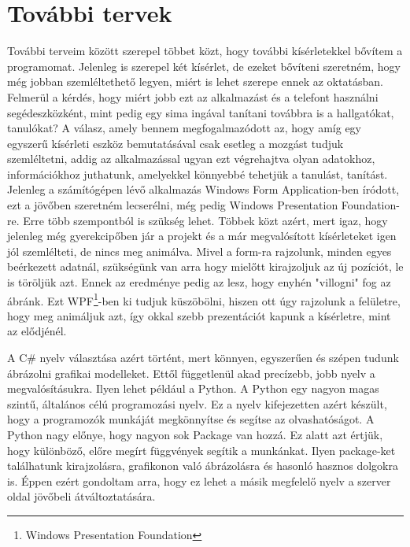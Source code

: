 \documentclass{thesis-ekf}
\theoremstyle{definition}
\theoremstyle{remark}
\begin{document}
\chapter{További tervek}
További terveim között szerepel többet közt, hogy további kísérletekkel bővítem a programomat. Jelenleg is szerepel két kísérlet, de ezeket bővíteni szeretném, hogy még jobban szemléltethető legyen, miért is lehet szerepe ennek az oktatásban. Felmerül a kérdés, hogy miért jobb ezt az alkalmazást és a telefont használni segédeszközként, mint pedig egy sima ingával tanítani továbbra is a hallgatókat, tanulókat? A válasz, amely bennem megfogalmazódott az, hogy amíg egy egyszerű kísérleti eszköz bemutatásával csak esetleg a mozgást tudjuk szemléltetni, addig az alkalmazással ugyan ezt végrehajtva olyan adatokhoz, információkhoz juthatunk, amelyekkel könnyebbé tehetjük a tanulást, tanítást.
Jelenleg a számítógépen lévő alkalmazás Windows Form Application-ben íródott, ezt a jövőben szeretném lecserélni, még pedig Windows Presentation Foundation-re. Erre több szempontból is szükség lehet. Többek közt azért, mert igaz, hogy jelenleg még gyerekcipőben jár a projekt és a már megvalósított kísérleteket igen jól szemlélteti, de nincs meg animálva. Mivel a form-ra rajzolunk, minden egyes beérkezett adatnál, szükségünk van arra hogy mielőtt kirajzoljuk az új pozíciót, le is töröljük azt. Ennek az eredménye pedig az lesz, hogy enyhén "villogni" fog az ábránk. Ezt WPF\footnote{Windows Presentation Foundation}-ben ki tudjuk küszöbölni, hiszen ott úgy rajzolunk a felületre, hogy meg animáljuk azt, így okkal szebb prezentációt kapunk a kísérletre, mint az elődjénél.
\par A C\# nyelv választása azért történt, mert könnyen, egyszerűen és szépen tudunk ábrázolni grafikai modelleket. Ettől függetlenül akad precízebb, jobb nyelv a megvalósításukra. Ilyen lehet például a Python. A Python egy nagyon magas szintű, általános célú programozási nyelv. Ez a nyelv kifejezetten azért készült, hogy a programozók munkáját megkönnyítse és segítse az olvashatóságot. A Python nagy előnye, hogy nagyon sok Package van hozzá. Ez alatt azt értjük, hogy különböző, előre megírt függvények segítik a munkánkat. Ilyen package-ket találhatunk kirajzolásra, grafikonon való ábrázolásra és hasonló hasznos dolgokra is. Éppen ezért gondoltam arra, hogy ez lehet a másik megfelelő nyelv a szerver oldal jövőbeli átváltoztatására.
\end{document}
